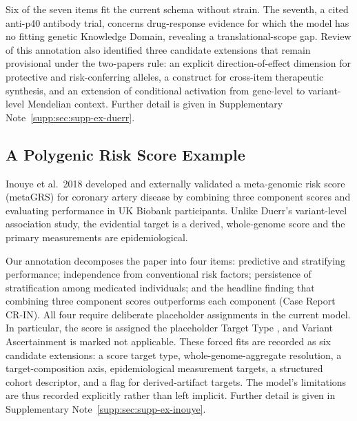 Six of the seven items fit the current schema without strain. The seventh, a
cited anti-p40 antibody trial, concerns drug-response evidence for which the
model has no fitting genetic Knowledge Domain, revealing a
translational-scope gap. Review of this annotation also identified three
candidate extensions that remain provisional under the two-papers rule: an
explicit direction-of-effect dimension for protective and risk-conferring
alleles, a construct for cross-item therapeutic synthesis, and an extension
of conditional activation from gene-level to variant-level Mendelian context.
Further detail is given in Supplementary
Note~\ref*{supp:sec:supp-ex-duerr}.

\subsection{A Polygenic Risk Score Example}
\label{sec:ex-inouye}

Inouye et al.\ 2018 developed and externally validated a meta-genomic risk
score (metaGRS) for coronary artery disease by combining three component
scores and evaluating performance in UK Biobank participants. Unlike Duerr's
variant-level association study, the evidential target is a derived,
whole-genome score and the primary measurements are epidemiological.

Our annotation decomposes the paper into four \GeneticEvidence{} items:
predictive and stratifying performance; independence from conventional risk
factors; persistence of stratification among medicated individuals; and the
headline finding that combining three component scores outperforms each
component (Case Report CR-IN). All four require deliberate placeholder
assignments in the current model. In particular, the score is assigned the
placeholder Target Type , and Variant Ascertainment is marked
not applicable. These forced fits are recorded as six candidate extensions:
a score target type, whole-genome-aggregate resolution, a target-composition
axis, epidemiological measurement targets, a structured cohort descriptor,
and a flag for derived-artifact targets. The model's limitations are thus
recorded explicitly rather than left implicit. Further detail is given in
Supplementary Note~\ref*{supp:sec:supp-ex-inouye}.
